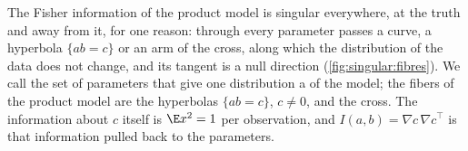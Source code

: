 \begin{refsection}
The Fisher information of the product model is singular everywhere, at the truth and away from it, for one reason: through every parameter passes a curve, a hyperbola $\{ab=c\}$ or an arm of the cross, along which the distribution of the data does not change, and its tangent is a null direction (\cref{fig:singular:fibres}). We call the set of parameters that give one distribution a  of the model; the fibers of the product model are the hyperbolas $\{ab=c\}$, $c\ne0$, and the cross. The information about $c$ itself is $\E x^2=1$ per observation, and $I(a,b)=\nabla c\,\nabla c^\top$ is that information pulled back to the parameters.


\end{refsection}
